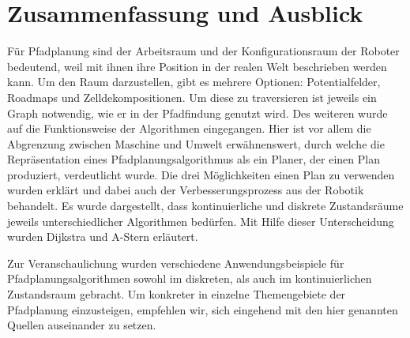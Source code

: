 
\chapter{Zusammenfassung und Ausblick}

Für Pfadplanung sind der Arbeitsraum und der Konfigurationsraum der Roboter bedeutend, weil mit ihnen ihre Position in der realen Welt beschrieben werden kann. Um den Raum darzustellen, gibt es mehrere Optionen: Potentialfelder, Roadmaps und Zelldekompositionen. Um diese zu traversieren ist jeweils ein Graph notwendig, wie er in der Pfadfindung genutzt wird.
Des weiteren wurde auf die Funktionsweise der Algorithmen eingegangen. Hier ist vor allem die Abgrenzung zwischen Maschine und Umwelt erwähnenswert, durch welche die Repräsentation eines Pfadplanungsalgorithmus als ein Planer, der einen Plan produziert, verdeutlicht wurde. Die drei Möglichkeiten einen Plan zu verwenden wurden erklärt und dabei auch der Verbesserungsprozess aus der Robotik behandelt. Es wurde dargestellt, dass kontinuierliche und diskrete Zustandsräume jeweils unterschiedlicher Algorithmen bedürfen. Mit Hilfe dieser Unterscheidung wurden Dijkstra und A-Stern erläutert. 

Zur Veranschaulichung wurden verschiedene Anwendungsbeispiele für Pfadplanungsalgorithmen sowohl im diskreten, als auch im kontinuierlichen Zustandsraum gebracht.
Um konkreter in einzelne Themengebiete der Pfadplanung einzusteigen, empfehlen wir, sich eingehend mit den hier genannten Quellen auseinander zu setzen.